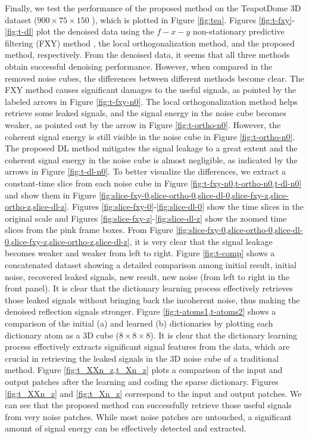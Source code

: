Finally, we test the performance of the proposed method on the TeapotDome 3D dataset ($900\times 75\times 150$ ), which is plotted in Figure \ref{fig:tea}. Figures \ref{fig:t-fxy}-\ref{fig:t-dl} plot the denoised data using the $f-x-y$ non-stationary predictive filtering (FXY) method \cite[]{wanghang2021geo}, the local orthogonalization method, and the proposed method, respectively. From the denoised data, it seems that all three methods obtain successful denoising performance. However, when compared in the removed noise cubes, the differences between different methods become clear. The FXY method causes significant damages to the useful signals, as pointed by the labeled arrows in Figure \ref{fig:t-fxy-n0}. The local orthogonalization method helps retrieve some leaked signals, and the signal energy in the noise cube becomes weaker, as pointed out by the arrow in Figure \ref{fig:t-ortho-n0}. However, the coherent signal energy is still visible in the noise cube in Figure \ref{fig:t-ortho-n0}.  The proposed DL method mitigates the signal leakage to a great extent and the coherent signal energy in the noise cube is almost negligible, as indicated by the arrows in Figure \ref{fig:t-dl-n0}. To better visualize the differences, we extract a constant-time slice from each noise cube in Figure \ref{fig:t-fxy-n0,t-ortho-n0,t-dl-n0} and show them in Figure \ref{fig:slice-fxy-0,slice-ortho-0,slice-dl-0,slice-fxy-z,slice-ortho-z,slice-dl-z}. Figures \ref{fig:slice-fxy-0}-\ref{fig:slice-dl-0} show the time slices in the original scale and Figures \ref{fig:slice-fxy-z}-\ref{fig:slice-dl-z} show the zoomed time slices from the pink frame boxes. From Figure \ref{fig:slice-fxy-0,slice-ortho-0,slice-dl-0,slice-fxy-z,slice-ortho-z,slice-dl-z}, it is very clear that the signal leakage becomes weaker and weaker from left to right. Figure \ref{fig:t-comp} shows a concatenated dataset showing a detailed comparison among initial result, initial noise, recovered leaked signals, new result, new noise (from left to right in the front panel).  It is clear that the dictionary learning process effectively retrieves those leaked signals without bringing back the incoherent noise, thus making the denoised reflection signals stronger. Figure \ref{fig:t-atoms1,t-atoms2} shows a comparison of the initial (a) and learned (b) dictionaries by plotting each dictionary atom as a 3D cube ($8\times 8 \times8$). It is clear that the dictionary learning process effectively extracts significant signal features from the data, which are crucial in retrieving the leaked signals in the 3D noise cube of a traditional method. Figure \ref{fig:t_XXn_z,t_Xn_z} plots a comparison of the input and output patches after the learning and coding the sparse dictionary. Figures \ref{fig:t_XXn_z} and \ref{fig:t_Xn_z} correspond to the input and output patches.  We can see that the proposed method can successfully retrieve those useful signals from very noise patches. While most noise patches are untouched, a significant amount of signal energy can be effectively detected and extracted. 


